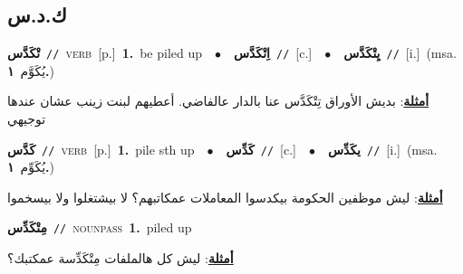 \documentclass[10pt,a4paper,twoside]{article} %
\begin{document}
\begin{multicols}{2}
\vspace{-3mm}
\subsection*{\color{blue}\foreignlanguage{arabic}{ك.د.س}\color{blue}{}} 

{\setlength\topsep{0pt}\textbf{\foreignlanguage{arabic}{تْكَدَّس}}\ {\color{gray}\texttt{//}\color{black}}\ \textsc{verb}\ [p.]\ \textbf{1.}~be piled up\ \ $\bullet$\ \ \setlength\topsep{0pt}\textbf{\foreignlanguage{arabic}{اِتْكَدَّس}}\ {\color{gray}\texttt{//}\color{black}}\ [c.]\ \ $\bullet$\ \ \setlength\topsep{0pt}\textbf{\foreignlanguage{arabic}{يِتْكَدَّس}}\ {\color{gray}\texttt{//}\color{black}}\ [i.]\ \color{gray}(msa. \foreignlanguage{arabic}{يُكَوَّم}~\foreignlanguage{arabic}{\textbf{١.}})\color{black}\  \begin{flushright}\color{gray}\foreignlanguage{arabic}{\textbf{\underline{\foreignlanguage{arabic}{أمثلة}}}: بديش الأوراق تِتْكَدَّس عنا بالدار عالفاضي. أعطيهم لبنت زينب عشان عندها توجيهي}\end{flushright}\color{black}} \vspace{2mm}

{\setlength\topsep{0pt}\textbf{\foreignlanguage{arabic}{كَدَّس}}\ {\color{gray}\texttt{//}\color{black}}\ \textsc{verb}\ [p.]\ \textbf{1.}~pile sth up\ \ $\bullet$\ \ \setlength\topsep{0pt}\textbf{\foreignlanguage{arabic}{كَدِّس}}\ {\color{gray}\texttt{//}\color{black}}\ [c.]\ \ $\bullet$\ \ \setlength\topsep{0pt}\textbf{\foreignlanguage{arabic}{يكَدِّس}}\ {\color{gray}\texttt{//}\color{black}}\ [i.]\ \color{gray}(msa. \foreignlanguage{arabic}{يُكَوِّم}~\foreignlanguage{arabic}{\textbf{١.}})\color{black}\  \begin{flushright}\color{gray}\foreignlanguage{arabic}{\textbf{\underline{\foreignlanguage{arabic}{أمثلة}}}: ليش موظفين الحكومة بيكدسوا المعاملات عمكاتبهم؟ لا بيشتغلوا ولا بيسخموا}\end{flushright}\color{black}} \vspace{2mm}

{\setlength\topsep{0pt}\textbf{\foreignlanguage{arabic}{مِتْكَدِّس}}\ {\color{gray}\texttt{//}\color{black}}\ \textsc{noun\textunderscore pass}\ \textbf{1.}~piled up\  \begin{flushright}\color{gray}\foreignlanguage{arabic}{\textbf{\underline{\foreignlanguage{arabic}{أمثلة}}}: ليش كل هالملفات مِتْكَدِّسة عمكتبك؟}\end{flushright}\color{black}} \vspace{2mm}


\end{multicols}
\end{document}
